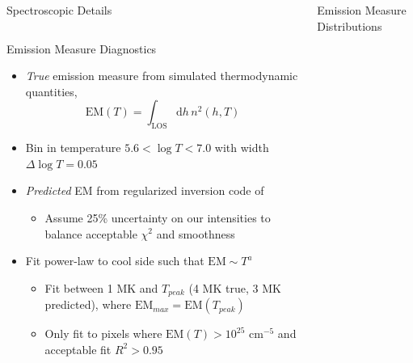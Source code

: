 \documentclass[final]{beamer}
\begin{document}
\begin{frame}
\begin{columns}[T]
\begin{column}{0.49\linewidth}
\begin{block}{Spectroscopic Details}
\begin{columns}[T]
\begin{column}{0.49\columnwidth}
\begin{table}
          \end{table}
        \end{column}
      \end{columns}
    \end{block}
    \begin{block}{Emission Measure Diagnostics}
      \begin{itemize}
        \item \textit{True} emission measure from simulated thermodynamic quantities,
              \begin{equation*}
                \mathrm{EM}(T) = \int_{\mathrm{LOS}}\mathrm{d}h\,n^2(h,T)
              \end{equation*} 
        \item Bin in temperature $5.6<\log{T}<7.0$ with width $\Delta\log{T}=0.05$
        \item \textit{Predicted} EM from regularized inversion code of \citet{hannah_differential_2012}
        \begin{itemize}
          \item Assume 25\% uncertainty on our intensities to balance acceptable $\chi^2$ and smoothness
        \end{itemize}
        \item Fit power-law to cool side such that $\mathrm{EM}\sim T^a$
        \begin{itemize}
          \item Fit between 1 MK and $T_{peak}$ (4 MK true, 3 MK predicted), where $\mathrm{EM}_{max}=\mathrm{EM}(T_{peak})$
          \item Only fit to pixels where $\mathrm{EM}(T)>10^{25}\,\,\mathrm{cm}^{-5}$ and acceptable fit $R^2>0.95$
        \end{itemize}
      \end{itemize}
    \end{block}
  \end{column}
  \begin{column}{0.49\linewidth}
    \begin{block}{Emission Measure Distributions}
      \begin{figure}

\end{figure}
\end{block}
\end{column}
\end{columns}
\end{frame}
\end{document}
